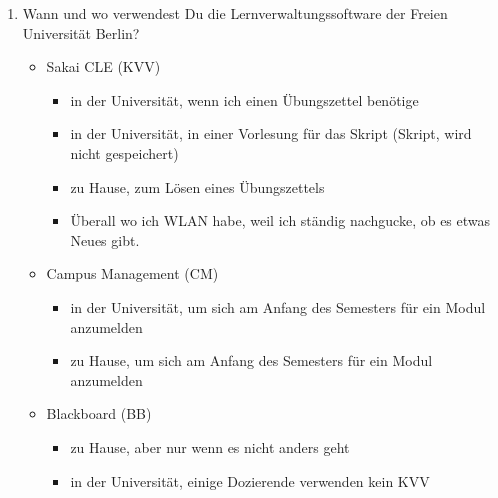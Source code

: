 \documentclass{article}
\begin{document}
\begin{enumerate}
\item Wann und wo verwendest Du die Lernverwaltungssoftware der Freien Universität Berlin?
\begin{itemize}
\item Sakai CLE (KVV)
\begin{itemize}
\item in der Universität, wenn ich einen Übungszettel benötige
\item in der Universität, in einer Vorlesung für das Skript (Skript, wird nicht gespeichert)
\item zu Hause, zum Lösen eines Übungszettels
\item Überall wo ich WLAN habe, weil ich ständig nachgucke, ob es etwas Neues gibt.
\end{itemize}
\item Campus Management (CM)
\begin{itemize}
\item in der Universität, um sich am Anfang des Semesters für ein Modul anzumelden
\item zu Hause, um sich am Anfang des Semesters für ein Modul anzumelden
\end{itemize}
\item Blackboard (BB)
\begin{itemize}
\item zu Hause, aber nur wenn es nicht anders geht
\item in der Universität, einige Dozierende verwenden kein KVV
\end{itemize}
\end{itemize}


\end{enumerate}
\end{document}
